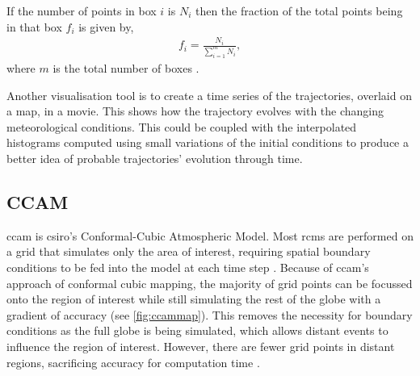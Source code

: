 	If the number of points in box $i$ is $N_i$ then the fraction of the total points being in that box $f_i$ is given by,
	\begin{align}
		f_i = \frac{N_i}{\sum_{i=1}^m N_i},
	\end{align}
	where $m$ is the total number of boxes \citep[Chapter 3]{lefebvre:2006vi}.

	Another visualisation tool is to create a time series of the trajectories, overlaid on a map, in a movie. This shows how the trajectory evolves with the changing meteorological conditions. This could be coupled with the interpolated histograms computed using small variations of the initial conditions to produce a better idea of probable trajectories' evolution through time.

	\subsection{CCAM}
	\label{subsec:ccam}

	\gls{ccam} is \gls{csiro}'s Conformal-Cubic Atmospheric Model. Most \gls{rcm}s are performed on a grid that simulates only the area of interest, requiring spatial boundary conditions to be fed into the model at each time step \citep{hurley2002air}. Because of \gls{ccam}'s approach of conformal cubic mapping, the majority of grid points can be focussed onto the region of interest while still simulating the rest of the globe with a gradient of accuracy (see \cref{fig:ccammap}). This removes the necessity for boundary conditions as the full globe is being simulated, which allows distant events to influence the region of interest. However, there are fewer grid points in distant regions, sacrificing accuracy for computation time \citep{mcgregor:2005wz}.

